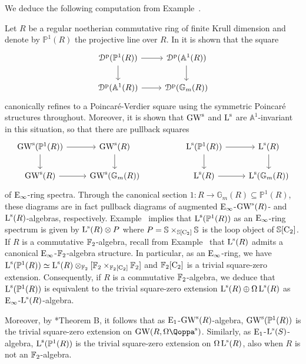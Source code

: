 We deduce the following computation from Example~.
\begin{example}
Let $R$ be a regular noetherian commutative ring of finite Krull dimension and denote by $\mathbb{P}^1(R)$ the projective line over $R$. In \cite{motives} it is shown that the square
\[
\begin{tikzcd}
	\Perf(\mathbb{P}^1(R)) \ar[r]\ar[d] & \Perf(\mathbb{A}^1(R)) \ar[d] \\
	\Perf(\mathbb{A}^1(R)) \ar[r] & \Perf(\mathbb{G}_m(R))
\end{tikzcd}
\]
canonically refines to a Poincar\'e-Verdier square using the symmetric Poincar\'e structures throughout. Moreover, it is shown that $\operatorname{GW}^{\mathrm{s}}$ and $\operatorname L^{\mathrm{s}}$ are $\mathbb{A}^1$-invariant in this situation, so that there are pullback squares
\[
\begin{tikzcd}
	\GW^\s(\mathbb{P}^1(R)) \ar[r] \ar[d] & \GW^\s(R) \ar[d] && \L^\s(\mathbb{P}^1(R)) \ar[r] \ar[d] & \L^\s(R) \ar[d] \\
	\GW^\s(R) \ar[r] & \GW^\s(\mathbb{G}_{m}(R)) && \L^\s(R) \ar[r] & \L^\s(\mathbb{G}_{m}(R))
\end{tikzcd}
\]
of ${\mathrm{E}_{\infty}}$-ring spectra. Through the canonical section $1 \colon R \to \mathbb{G}_m(R) \subseteq \mathbb{P}^1(R)$, these diagrams are in fact pullback diagrams of augmented ${\mathrm{E}_{\infty}}$-$\operatorname{GW}^{\mathrm{s}}(R)$- and $\operatorname L^{\mathrm{s}}(R)$-algebras, respectively. Example~ implies that $\operatorname L^{\mathrm{s}}(\mathbb{P}^1(R))$ as an ${\mathrm{E}_{\infty}}$-ring spectrum is given by $\operatorname L^{\mathrm{s}}(R) \otimes P$ where $P = \mathbb{S} \times_{\mathbb{S}[\mathrm{C_2}]} \mathbb{S}$ is the loop object of $\mathbb{S}[\mathrm{C_2}]$. If $R$ is a commutative $\mathbb{F}_2$-algebra, recall from Example~ that $\operatorname L^{\mathrm{s}}(R)$ admits a canonical ${\mathrm{E}_{\infty}}$-$\mathbb{F}_2$-algebra structure. In particular, as an ${\mathrm{E}_{\infty}}$-ring, we have $\operatorname L^{\mathrm{s}}(\mathbb{P}^1(R)) \simeq \operatorname L^{\mathrm{s}}(R) \otimes_{\mathbb{F}_2}[ \mathbb{F}_2 \times_{\mathbb{F}_2[\mathrm{C_2}]} \mathbb{F}_2]$ and $\mathbb{F}_2[\mathrm{C_2}]$ is a trivial square-zero extension. Consequently, if $R$ is a commutative $\mathbb{F}_2$-algebra, we deduce that $\operatorname L^{\mathrm{s}}(\mathbb{P}^1(R))$ is equivalent to the trivial square-zero extension $\operatorname L^{\mathrm{s}}(R) \oplus \Omega\operatorname L^{\mathrm{s}}(R)$ as ${\mathrm{E}_{\infty}}$-$\operatorname L^{\mathrm{s}}(R)$-algebra.

Moreover, by \cite{formality}*{Theorem B}, it follows that as ${\mathrm{E}_{1}}$-$\operatorname{GW}^{\mathrm{s}}(R)$-algebra, $\operatorname{GW}^{\mathrm{s}}(\mathbb{P}^1(R))$ is the trivial square-zero extension on $\GW(R,\Omega \QF^\s)$. Similarly, as ${\mathrm{E}_{1}}$-$\operatorname L^{\mathrm{s}}(S)$-algebra, $\operatorname L^{\mathrm{s}}(\mathbb{P}^1(R))$ is the trivial square-zero extension on $\Omega \operatorname L^{\mathrm{s}}(R)$, also when $R$ is not an $\mathbb{F}_2$-algebra.



\end{example}
